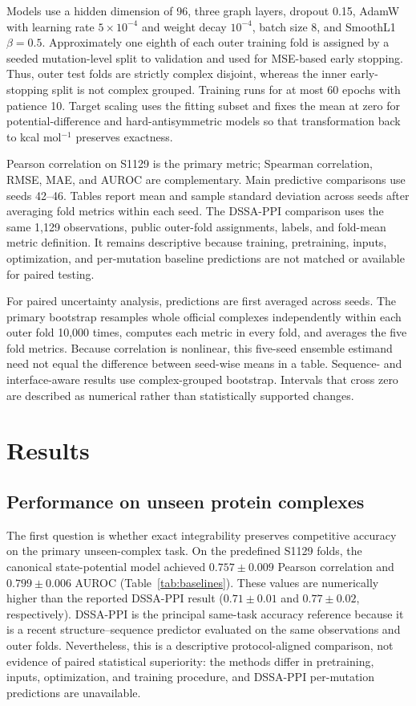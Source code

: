 \documentclass[preprint,12pt]{elsarticle}
\begin{document}
Models use a hidden dimension of 96, three graph layers, dropout 0.15, AdamW with learning rate $5\times10^{-4}$ and weight decay $10^{-4}$, batch size 8, and SmoothL1 $\beta=0.5$. Approximately one eighth of each outer training fold is assigned by a seeded mutation-level split to validation and used for MSE-based early stopping. Thus, outer test folds are strictly complex disjoint, whereas the inner early-stopping split is not complex grouped. Training runs for at most 60 epochs with patience 10. Target scaling uses the fitting subset and fixes the mean at zero for potential-difference and hard-antisymmetric models so that transformation back to kcal mol$^{-1}$ preserves exactness.

Pearson correlation on S1129 is the primary metric; Spearman correlation, RMSE, MAE, and AUROC are complementary. Main predictive comparisons use seeds 42--46. Tables report mean and sample standard deviation across seeds after averaging fold metrics within each seed. The DSSA-PPI comparison uses the same 1,129 observations, public outer-fold assignments, labels, and fold-mean metric definition. It remains descriptive because training, pretraining, inputs, optimization, and per-mutation baseline predictions are not matched or available for paired testing.

For paired uncertainty analysis, predictions are first averaged across seeds. The primary bootstrap resamples whole official complexes independently within each outer fold 10,000 times, computes each metric in every fold, and averages the five fold metrics. Because correlation is nonlinear, this five-seed ensemble estimand need not equal the difference between seed-wise means in a table. Sequence- and interface-aware results use complex-grouped bootstrap. Intervals that cross zero are described as numerical rather than statistically supported changes.

\section{Results}
\label{sec:results}

\subsection{Performance on unseen protein complexes}

The first question is whether exact integrability preserves competitive accuracy on the primary unseen-complex task. On the predefined S1129 folds, the canonical state-potential model achieved $0.757\pm0.009$ Pearson correlation and $0.799\pm0.006$ AUROC (Table~\ref{tab:baselines}). These values are numerically higher than the reported DSSA-PPI result ($0.71\pm0.01$ and $0.77\pm0.02$, respectively). DSSA-PPI is the principal same-task accuracy reference because it is a recent structure--sequence predictor evaluated on the same observations and outer folds. Nevertheless, this is a descriptive protocol-aligned comparison, not evidence of paired statistical superiority: the methods differ in pretraining, inputs, optimization, and training procedure, and DSSA-PPI per-mutation predictions are unavailable.
\end{document}
